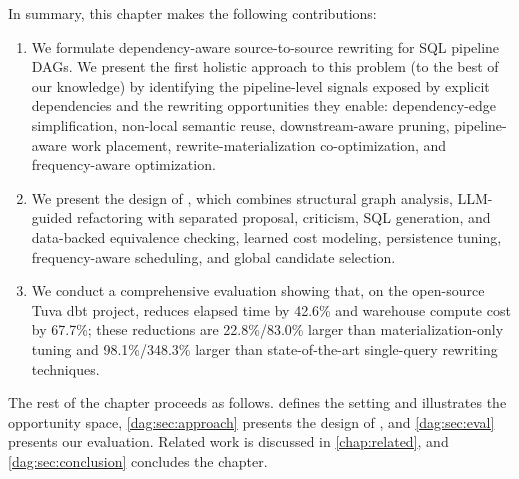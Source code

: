 In summary, this chapter makes the following contributions:
\begin{enumerate}[leftmargin=*, topsep=2pt, itemsep=1pt]
\item We formulate dependency-aware source-to-source rewriting for SQL
pipeline DAGs. We present the first holistic approach to this problem
(to the best of our knowledge) by identifying the pipeline-level
signals exposed by explicit dependencies and the rewriting
opportunities they enable: dependency-edge simplification, non-local
semantic reuse, downstream-aware pruning, pipeline-aware work
placement, rewrite-materialization co-optimization, and
frequency-aware optimization.
\item We present the design of \dagsmith, which combines structural
graph analysis, LLM-guided refactoring with separated proposal,
criticism, SQL generation, and data-backed equivalence checking,
learned cost modeling, persistence tuning, frequency-aware scheduling,
and global candidate selection.
\item We conduct a comprehensive evaluation showing that, on the
open-source Tuva dbt project, \dagsmith reduces elapsed time by 42.6\%
and warehouse compute cost by 67.7\%; these reductions are
22.8\%/83.0\% larger than materialization-only tuning and
98.1\%/348.3\% larger than state-of-the-art single-query rewriting
techniques.
\end{enumerate}

The rest of the chapter proceeds as follows. 
defines the setting and illustrates the opportunity space,
\cref{dag:sec:approach} presents the design of \dagsmith, and
\cref{dag:sec:eval} presents our evaluation. Related work is discussed
in \cref{chap:related}, and \cref{dag:sec:conclusion} concludes the
chapter.
